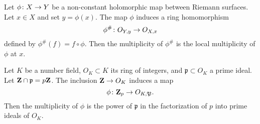 \documentclass[12pt]{article}
\begin{document}
\begin{example}
  Let $\phi {\colon} X \to Y$ be a non-constant holomorphic map between Riemann surfaces.
  Let $x \in X$ and set $y = \phi(x)$.
  The map $\phi$ induces a ring homomorphism
  \[ \phi^{\#} {\colon} O_{Y,y} \to O_{X,x}\]
  defined by $\phi^\# (f) = f \circ \phi$.
  Then the multiplicity of $\phi^\#$ is the local multiplicity of $\phi$ at $x$.
\end{example}

\begin{example}
  Let $K$ be a number field, $O_K \subset K$ its ring of integers, and $\mathfrak p \subset O_K$ a prime ideal.
  Let ${\bf Z} \cap \mathfrak p = p{\bf Z}$.
  The inclusion ${\bf Z} \to O_K$ induces a map
  \[ \phi {\colon} {\bf Z}_p \to O_{K, \mathfrak P}.\]
  Then the multiplicity of $\phi$ is the power of $\mathfrak p$ in the factorization of $p$ into prime ideals of $O_K$.
\end{example}
\end{document}
